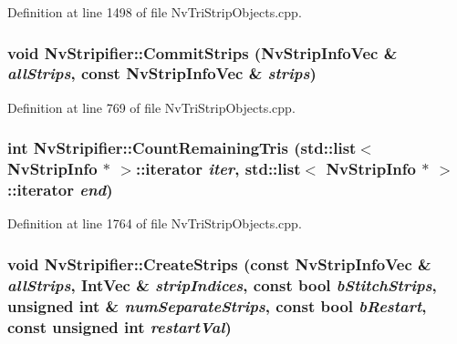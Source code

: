 Definition at line 1498 of file NvTriStripObjects.cpp.\hypertarget{class_nv_stripifier_a94ce7ff064c7fd29890f90d2fb0d9cc}{
\subsubsection[{CommitStrips}]{\setlength{\rightskip}{0pt plus 5cm}void NvStripifier::CommitStrips ({\bf NvStripInfoVec} \& {\em allStrips}, \/  const {\bf NvStripInfoVec} \& {\em strips})}}
\label{class_nv_stripifier_a94ce7ff064c7fd29890f90d2fb0d9cc}




Definition at line 769 of file NvTriStripObjects.cpp.\hypertarget{class_nv_stripifier_4bafe0ae9aa21f466b0e1faf7194861c}{
\subsubsection[{CountRemainingTris}]{\setlength{\rightskip}{0pt plus 5cm}int NvStripifier::CountRemainingTris (std::list$<$ {\bf NvStripInfo} $\ast$ $>$::iterator {\em iter}, \/  std::list$<$ {\bf NvStripInfo} $\ast$ $>$::iterator {\em end})}}
\label{class_nv_stripifier_4bafe0ae9aa21f466b0e1faf7194861c}




Definition at line 1764 of file NvTriStripObjects.cpp.\hypertarget{class_nv_stripifier_089482ef9c1cab8f595bf51cae36555d}{
\subsubsection[{CreateStrips}]{\setlength{\rightskip}{0pt plus 5cm}void NvStripifier::CreateStrips (const {\bf NvStripInfoVec} \& {\em allStrips}, \/  {\bf IntVec} \& {\em stripIndices}, \/  const bool {\em bStitchStrips}, \/  unsigned int \& {\em numSeparateStrips}, \/  const bool {\em bRestart}, \/  const unsigned int {\em restartVal})}}
\label{class_nv_stripifier_089482ef9c1cab8f595bf51cae36555d}




